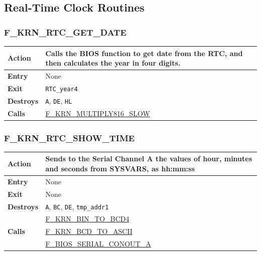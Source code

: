 \documentclass[a4paper,11pt]{article}
\begin{document}
    \subsection{Real-Time Clock Routines}

        \subsubsection{F\_KRN\_RTC\_GET\_DATE}
        \label{func:fkrnrtcgetdate}
        \begin{tabular}{l p{9cm}}
            \hline\textbf{Action}
            & Calls the BIOS function to get date from the RTC, and then
            calculates the year in four digits. \\
            \hline\textbf{Entry} & None \\
            \hline\textbf{Exit} & \texttt{RTC\_year4}\\
            \hline\textbf{Destroys} & \texttt{A}, \texttt{DE}, \texttt{HL} \\
            \hline\textbf{Calls}
            & \hyperref[func:fkrnmultiply816slow]{F\_KRN\_MULTIPLY816\_SLOW}\\
            \hline
        \end{tabular}

        \subsubsection{F\_KRN\_RTC\_SHOW\_TIME}
        \label{func:fkrnrtcshowtime}
        \begin{tabular}{l p{9cm}}
            \hline\textbf{Action}
            & Sends to the \textbf{Serial Channel} A the values of hour, minutes
            and seconds from SYSVARS, as hh:mm:ss\\
            \hline\textbf{Entry} & None \\
            \hline\textbf{Exit} & None \\
            \hline\textbf{Destroys} & \texttt{A}, \texttt{BC}, \texttt{DE},
            \texttt{tmp\_addr1}\\
            \hline\multirow[t]{3}{4em}{\textbf{Calls}}
            & \hyperref[func:fkrnbintobcd4]{F\_KRN\_BIN\_TO\_BCD4}\\
            & \hyperref[func:fkrnbcdtoascii]{F\_KRN\_BCD\_TO\_ASCII}\\
            & \hyperref[func:fbiosserialconouta]{F\_BIOS\_SERIAL\_CONOUT\_A}\\
            \hline
        \end{tabular}
\end{document}
